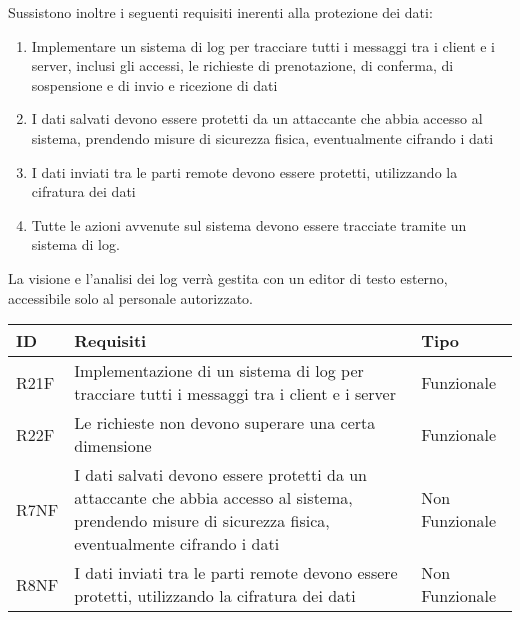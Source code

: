 Sussistono inoltre i seguenti requisiti inerenti alla protezione dei dati:
\begin{enumerate}
  \item Implementare un sistema di log per tracciare tutti i messaggi tra i client e i server, inclusi gli accessi, le richieste di prenotazione, di conferma, di sospensione e di invio e ricezione di dati
  \item I dati salvati devono essere protetti da un attaccante che abbia accesso al sistema, prendendo misure di sicurezza fisica, eventualmente cifrando i dati
  \item I dati inviati tra le parti remote devono essere protetti, utilizzando la cifratura dei dati
  \item Tutte le azioni avvenute sul sistema devono essere tracciate
        tramite un sistema di log.
\end{enumerate}

\raggedright{La visione e l'analisi dei log verrà gestita
  con un editor di testo esterno, accessibile solo al personale
  autorizzato.}
\hfill \break

\begin{tabular} {|P{1.3cm}|P{11.2cm}|P{3cm}|}
  \hline
  \textbf{ID}                       & \textbf{Requisiti}                                                  & \textbf{Tipo} \\
  \hline
  R21F                              & Implementazione di un sistema di log per tracciare tutti i messaggi
  tra i client e i server           & Funzionale                                                                          \\
  \hline
  R22F                              & Le richieste non devono superare una certa dimensione               & Funzionale    \\
  \hline
  R7NF                              & I dati salvati devono essere protetti da un attaccante che abbia
  accesso al sistema, prendendo misure di sicurezza fisica, eventualmente
  cifrando i dati                   & Non Funzionale                                                                      \\
  \hline
  R8NF                              & I dati inviati tra le parti remote devono essere protetti,
  utilizzando la cifratura dei dati & Non Funzionale                                                                      \\
  \hline
\end{tabular}

